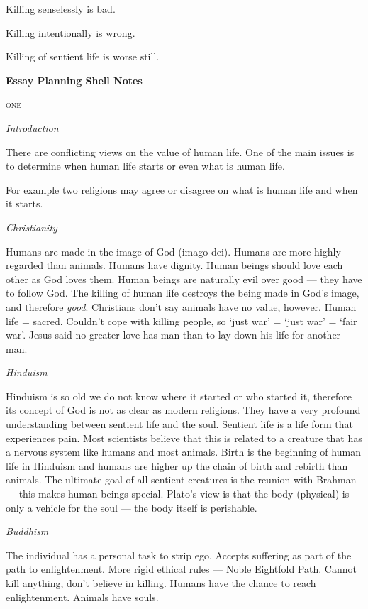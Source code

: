 \documentclass{article}
\begin{document}
Killing senselessly is bad.

Killing intentionally is wrong.

Killing of sentient life is worse still.

\textbf{Essay Planning Shell Notes}

\textsc{one}

\textsl{Introduction}

There are conflicting views on the value of human life.  One of the main issues is to determine when human life starts or even what is human life.

For example two religions may agree or disagree on what is human life and when it starts.

\textsl{Christianity}

Humans are made in the image of God (imago dei).  Humans are more highly regarded than animals.  Humans have dignity.  Human beings should love each other as God loves them.  Human beings are naturally evil over good --- they have to follow God.  The killing of human life destroys the being made in God's image, and therefore \textit{good}.  Christians don't say animals have no value, however.  Human life = sacred.  Couldn't cope with killing people, so `just war' = `just war' = `fair war'.  Jesus said no greater love has man than to lay down his life for another man.

\textsl{Hinduism}

Hinduism is so old we do not know where it started or who started it, therefore its concept of God is not as clear as modern religions.  They have a very profound understanding between sentient life and the soul.  Sentient life is a life form that experiences pain.  Most scientists believe that this is related to a creature that has a nervous system like humans and most animals.  Birth is the beginning of human life in Hinduism and humans are higher up the chain of birth and rebirth than animals.  The ultimate goal of all sentient creatures is the reunion with Brahman --- this makes human beings special.  Plato's view is that the body (physical) is only a vehicle for the soul --- the body itself is perishable.

\textsl{Buddhism}

The individual has a personal task to strip ego.  Accepts suffering as part of the path to enlightenment.  More rigid ethical rules --- Noble Eightfold Path.  Cannot kill anything, don't believe in killing.  Humans have the chance to reach enlightenment.  Animals have souls.
\end{document}
